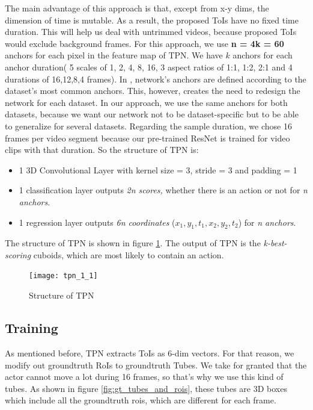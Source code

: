 The main advantage of this approach is that, except from x-y dims, the dimension of time is mutable. As a result, the proposed ToIs have
no fixed time duration. This will help us deal with untrimmed videos, because proposed ToIs would exclude background frames.
For this approach, we use \textbf{n = 4k = 60} anchors for each pixel in the feature map of TPN. We have $k$ anchors for each anchor 
duration( 5 scales of 1, 2, 4, 8, 16, 3 aspect ratios of 1:1, 1:2, 2:1 and 4 durations of 16,12,8,4 frames).
In \cite{DBLP:journals/corr/HouCS17},  network's anchors are defined according to the dataset's most common anchors. This, however,
creates the need to redesign the network for each dataset. In our approach, we use the same anchors for both datasets, because we want our network not
to be dataset-specific but to be able to generalize for several datasets. Regarding the sample duration, we chose 16 frames per video segment because
our pre-trained ResNet is trained for video clips with that duration.
So the structure of TPN is:
\begin{itemize}
\item 1 3D Convolutional Layer with kernel size = 3, stride = 3 and padding = 1
\item 1 classification layer outputs \textit{2n scores,} whether there is an action or not for \textit{n anchors}.
\item 1 regression layer outputs \textit{6n coordinates} ($x_1,y_1,t_1,x_2,y_2,t_2$) for \textit{n anchors}.
\end{itemize}

The structure of TPN is shown in figure \ref{fig:tpn_1_1}. The output of TPN is the \textit{k-best-scoring} cuboids, which are most likely to contain an action.
\begin{figure}[h]

  \texttt{[image: tpn\_1\_1]}
  \caption{Structure of TPN}
  \label{fig:tpn_1_1}
\end{figure}

\subsection{Training}
As mentioned before, TPN extracts ToIs as 6-dim vectors. For that reason, we modify out groundtruth RoIs to groundtruth Tubes.
We take for granted that the actor cannot move a lot during 16 frames, so that's why we use this kind of tubes. As shown 
in figure \ref{fig:gt_tubes_and_rois}, these tubes are 3D boxes which include all the groundtruth rois, which are different
for each frame.

